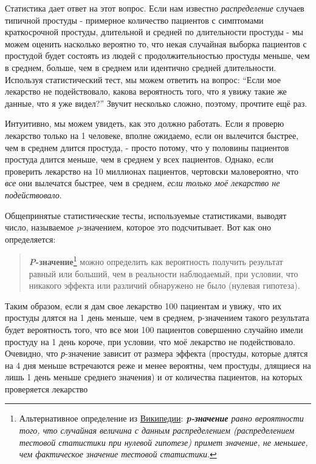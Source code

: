 Статистика дает ответ на этот вопрос. Если нам известно \emph{распределение} случаев типичной простуды - примерное количество пациентов с симптомами краткосрочной простуды, длительной и средней по длительности простуды - мы можем оценить насколько вероятно то, что некая случайная выборка пациентов с простудой будет состоять из людей с продолжительностью простуды меньше, чем в среднем, больше, чем в среднем или идентично средней длительности. Используя статистический тест, мы можем ответить на вопрос: ``Если мое лекарство не подействовало, какова вероятность того, что я увижу такие же данные, что я уже видел?''
Звучит несколько сложно, поэтому, прочтите ещё раз.


Интуитивно, мы можем увидеть, как это должно работать. Если я проверю лекарство только на 1 человеке, вполне ожидаемо, если он вылечится быстрее, чем в среднем длится простуда, - просто потому, что у половины пациентов простуда длится меньше, чем в среднем у всех пациентов. Однако, если проверить лекарство на 10 миллионах пациентов, чертовски маловероятно, что \emph{все} они вылечатся быстрее, чем в среднем, \emph{если только моё лекарство не подействовало}.    

Общепринятые статистические тесты, используемые статистиками, выводят число, называемое \emph{p}-значением, которое это подсчитывает. Вот как оно определяется:

\begin{quotation}

\textbf{\emph{P}-значение}\footnote{Альтернативное определение из \href{http://goo.gl/JHujIw}{Википедии}: \textit{\textbf{p-значение} равно вероятности того, что случайная величина с данным распределением (распределением тестовой статистики при нулевой гипотезе) примет значение, не меньшее, чем фактическое значение тестовой статистики}.} можно определить как вероятность получить результат равный или больший, чем в реальности наблюдаемый, при условии, что никакого эффекта или различий обнаружено не было (нулевая гипотеза)\cite{goodman_toward_1999}.   

\end{quotation}


Таким образом, если я дам свое лекарство 100 пациентам и увижу, что их простуды длятся на 1 день меньше, чем в среднем, р-значением такого результата будет вероятность того, что все мои 100 пациентов совершенно случайно имели простуду на 1 день короче, при условии, что моё лекарство не подействовало. Очевидно, что \emph{р}-значение зависит от размера эффекта (простуды, которые длятся на 4 дня меньше встречаются реже и менее вероятны, чем простуды, длящиеся на лишь 1 день меньше среднего значения) и от количества пациентов, на которых проверяется лекарство  


